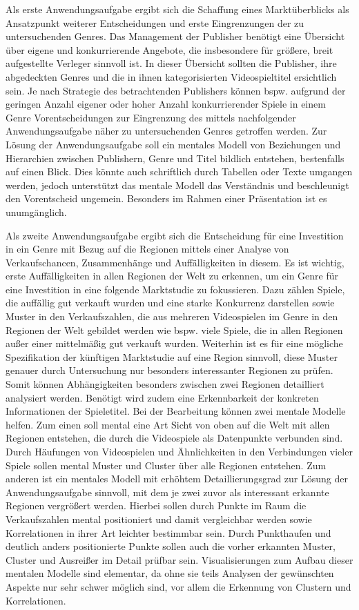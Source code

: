 \documentclass[usegeometry=true]{scrartcl}
\begin{document}
Als erste Anwendungsaufgabe ergibt sich die Schaffung eines Marktüberblicks als Ansatzpunkt weiterer Entscheidungen und erste Eingrenzungen der zu untersuchenden Genres. 
Das Management der Publisher benötigt eine Übersicht über eigene und konkurrierende Angebote, die insbesondere für größere, breit aufgestellte Verleger sinnvoll ist.
In dieser Übersicht sollten die Publisher, ihre abgedeckten Genres und die in ihnen kategorisierten Videospieltitel ersichtlich sein. 
Je nach Strategie des betrachtenden Publishers können bspw. aufgrund der geringen Anzahl eigener oder hoher Anzahl konkurrierender Spiele in einem Genre Vorentscheidungen zur Eingrenzung des mittels nachfolgender Anwendungsaufgabe näher zu untersuchenden Genres getroffen werden. 
Zur Lösung der Anwendungsaufgabe soll ein mentales Modell von Beziehungen und Hierarchien zwischen Publishern, Genre und Titel bildlich entstehen, bestenfalls auf einen Blick.
Dies könnte auch schriftlich durch Tabellen oder Texte umgangen werden, jedoch unterstützt das mentale Modell das Verständnis und beschleunigt den Vorentscheid ungemein. 
Besonders im Rahmen einer Präsentation ist es unumgänglich.

Als zweite Anwendungsaufgabe ergibt sich die Entscheidung für eine Investition in ein Genre mit Bezug auf die Regionen mittels einer Analyse von Verkaufschancen, Zusammenhänge und Auffälligkeiten in diesem.
Es ist wichtig, erste Auffälligkeiten in allen Regionen der Welt zu erkennen, um ein Genre für eine Investition in eine folgende Marktstudie zu fokussieren.
Dazu zählen Spiele, die auffällig gut verkauft wurden und eine starke Konkurrenz darstellen sowie Muster in den Verkaufszahlen, die aus mehreren Videospielen im Genre in den Regionen der Welt gebildet werden wie bspw. viele Spiele, die in allen Regionen außer einer mittelmäßig gut verkauft wurden.
Weiterhin ist es für eine mögliche Spezifikation der künftigen Marktstudie auf eine Region sinnvoll, diese Muster genauer durch Untersuchung nur besonders interessanter Regionen zu prüfen. 
Somit können Abhängigkeiten besonders zwischen zwei Regionen detailliert analysiert werden. 
Benötigt wird zudem eine Erkennbarkeit der konkreten Informationen der Spieletitel. 
Bei der Bearbeitung können zwei mentale Modelle helfen.
Zum einen soll mental eine Art Sicht von oben auf die Welt mit allen Regionen entstehen, die durch die Videospiele als Datenpunkte verbunden sind. 
Durch Häufungen von Videospielen und Ähnlichkeiten in den Verbindungen vieler Spiele sollen mental Muster und Cluster über alle Regionen entstehen.
Zum anderen ist ein mentales Modell mit erhöhtem Detaillierungsgrad zur Lösung der Anwendungsaufgabe sinnvoll, mit dem je zwei zuvor als interessant erkannte Regionen vergrößert werden. 
Hierbei sollen durch Punkte im Raum die Verkaufszahlen mental positioniert und damit vergleichbar werden sowie Korrelationen in ihrer Art leichter bestimmbar sein. 
Durch Punkthaufen und deutlich anders positionierte Punkte sollen auch die vorher erkannten Muster, Cluster und Ausreißer im Detail prüfbar sein. %
Visualisierungen zum Aufbau dieser mentalen Modelle sind elementar, da ohne sie teils Analysen der gewünschten Aspekte nur sehr schwer möglich sind, vor allem die Erkennung von Clustern und Korrelationen.
\end{document}
